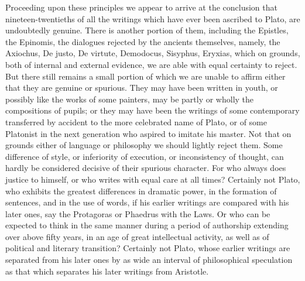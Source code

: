 \documentclass[11pt,letter]{article}
\begin{document}
\par  Proceeding upon these principles we appear to arrive at the conclusion that nineteen-twentieths of all the writings which have ever been ascribed to Plato, are undoubtedly genuine. There is another portion of them, including the Epistles, the Epinomis, the dialogues rejected by the ancients themselves, namely, the Axiochus, De justo, De virtute, Demodocus, Sisyphus, Eryxias, which on grounds, both of internal and external evidence, we are able with equal certainty to reject. But there still remains a small portion of which we are unable to affirm either that they are genuine or spurious. They may have been written in youth, or possibly like the works of some painters, may be partly or wholly the compositions of pupils; or they may have been the writings of some contemporary transferred by accident to the more celebrated name of Plato, or of some Platonist in the next generation who aspired to imitate his master. Not that on grounds either of language or philosophy we should lightly reject them. Some difference of style, or inferiority of execution, or inconsistency of thought, can hardly be considered decisive of their spurious character. For who always does justice to himself, or who writes with equal care at all times? Certainly not Plato, who exhibits the greatest differences in dramatic power, in the formation of sentences, and in the use of words, if his earlier writings are compared with his later ones, say the Protagoras or Phaedrus with the Laws. Or who can be expected to think in the same manner during a period of authorship extending over above fifty years, in an age of great intellectual activity, as well as of political and literary transition? Certainly not Plato, whose earlier writings are separated from his later ones by as wide an interval of philosophical speculation as that which separates his later writings from Aristotle.
\end{document}
